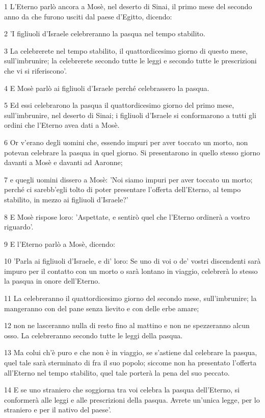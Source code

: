 \par 1 L'Eterno parlò ancora a Mosè, nel deserto di Sinai, il primo mese del secondo anno da che furono usciti dal paese d'Egitto, dicendo:
\par 2 'I figliuoli d'Israele celebreranno la pasqua nel tempo stabilito.
\par 3 La celebrerete nel tempo stabilito, il quattordicesimo giorno di questo mese, sull'imbrunire; la celebrerete secondo tutte le leggi e secondo tutte le prescrizioni che vi si riferiscono'.
\par 4 E Mosè parlò ai figliuoli d'Israele perché celebrassero la pasqua.
\par 5 Ed essi celebrarono la pasqua il quattordicesimo giorno del primo mese, sull'imbrunire, nel deserto di Sinai; i figliuoli d'Israele si conformarono a tutti gli ordini che l'Eterno avea dati a Mosè.
\par 6 Or v'erano degli uomini che, essendo impuri per aver toccato un morto, non potevan celebrare la pasqua in quel giorno. Si presentarono in quello stesso giorno davanti a Mosè e davanti ad Aaronne;
\par 7 e quegli uomini dissero a Mosè: 'Noi siamo impuri per aver toccato un morto; perché ci sarebb'egli tolto di poter presentare l'offerta dell'Eterno, al tempo stabilito, in mezzo ai figliuoli d'Israele?'
\par 8 E Mosè rispose loro: 'Aspettate, e sentirò quel che l'Eterno ordinerà a vostro riguardo'.
\par 9 E l'Eterno parlò a Mosè, dicendo:
\par 10 'Parla ai figliuoli d'Israele, e di' loro: Se uno di voi o de' vostri discendenti sarà impuro per il contatto con un morto o sarà lontano in viaggio, celebrerà lo stesso la pasqua in onore dell'Eterno.
\par 11 La celebreranno il quattordicesimo giorno del secondo mese, sull'imbrunire; la mangeranno con del pane senza lievito e con delle erbe amare;
\par 12 non ne lasceranno nulla di resto fino al mattino e non ne spezzeranno alcun osso. La celebreranno secondo tutte le leggi della pasqua.
\par 13 Ma colui ch'è puro e che non è in viaggio, se s'astiene dal celebrare la pasqua, quel tale sarà sterminato di fra il suo popolo; siccome non ha presentato l'offerta all'Eterno nel tempo stabilito, quel tale porterà la pena del suo peccato.
\par 14 E se uno straniero che soggiorna tra voi celebra la pasqua dell'Eterno, si conformerà alle leggi e alle prescrizioni della pasqua. Avrete un'unica legge, per lo straniero e per il nativo del paese'.

